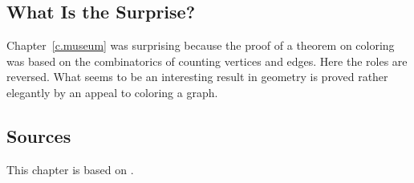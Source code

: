 \subsection*{What Is the Surprise?}
Chapter~\ref{c.museum} was surprising because the proof of a theorem on coloring was based on the combinatorics of counting vertices and edges. Here the roles are reversed. What seems to be an interesting result in geometry is proved rather elegantly by an appeal to coloring a graph.
\subsection*{Sources}

This chapter is based on \cite[Chap.~39]{thebook}.
